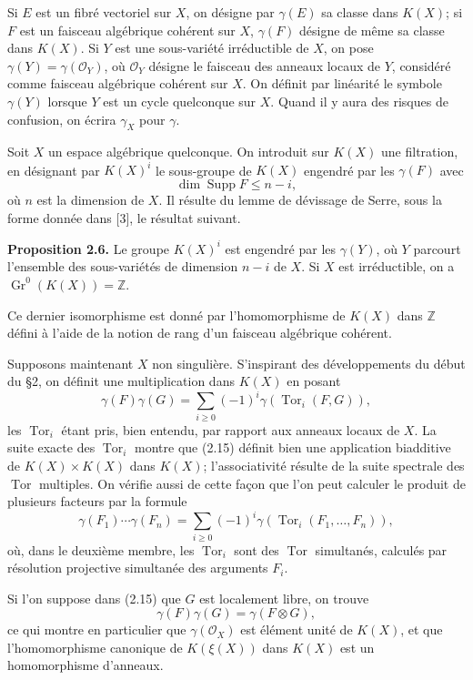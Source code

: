 \documentclass[11pt]{article}
\newcommand{\Gr}{\operatorname{Gr}}
\newcommand{\Tor}{\operatorname{Tor}}
\providecommand{\Z}{\mathbb Z}
\providecommand{\Gr}{\operatorname{Gr}}
\providecommand{\Tor}{\operatorname{Tor}}
\providecommand{\Supp}{\operatorname{Supp}}
\providecommand{\Gr}{\operatorname{G}}
\providecommand{\cO}{\mathcal O}
\begin{document}
Si $E$ est un fibré vectoriel sur $X$, on désigne par $\gamma(E)$ sa classe dans $K(X)$; si $F$ est un faisceau algébrique cohérent sur $X$, $\gamma(F)$ désigne de même sa classe dans $K(X)$. Si $Y$ est une sous-variété irréductible de $X$, on pose $\gamma(Y)=\gamma(\cO_Y)$, où $\cO_Y$ désigne le faisceau des anneaux locaux de $Y$, considéré comme faisceau algébrique cohérent sur $X$. On définit par linéarité le symbole $\gamma(Y)$ lorsque $Y$ est un cycle quelconque sur $X$. Quand il y aura des risques de confusion, on écrira $\gamma_X$ pour $\gamma$.

Soit $X$ un espace algébrique quelconque. On introduit sur $K(X)$ une filtration, en désignant par $K(X)^i$ le sous-groupe de $K(X)$ engendré par les $\gamma(F)$ avec
\[
 \dim\Supp F\leq n-i,
\]
où $n$ est la dimension de $X$. Il résulte du lemme de dévissage de Serre, sous la forme donnée dans [3], le résultat suivant.

\textbf{Proposition 2.6.} Le groupe $K(X)^i$ est engendré par les $\gamma(Y)$, où $Y$ parcourt l'ensemble des sous-variétés de dimension $n-i$ de $X$. Si $X$ est irréductible, on a $\Gr^0(K(X))=\Z$.

Ce dernier isomorphisme est donné par l'homomorphisme de $K(X)$ dans $\Z$ défini à l'aide de la notion de rang d'un faisceau algébrique cohérent.

Supposons maintenant $X$ non singulière. S'inspirant des développements du début du \S 2, on définit une multiplication dans $K(X)$ en posant
\begin{equation}\tag{2.15}
 \gamma(F)\gamma(G)=\sum_{i\geq0}(-1)^i\gamma(\Tor_i(F,G)),
\end{equation}
les $\Tor_i$ étant pris, bien entendu, par rapport aux anneaux locaux de $X$. La suite exacte des $\Tor_i$ montre que (2.15) définit bien une application biadditive de $K(X)\times K(X)$ dans $K(X)$; l'associativité résulte de la suite spectrale des $\Tor$ multiples. On vérifie aussi de cette façon que l'on peut calculer le produit de plusieurs facteurs par la formule
\begin{equation}\tag{2.16}
 \gamma(F_1)\cdots\gamma(F_n)=\sum_{i\geq0}(-1)^i\gamma(\Tor_i(F_1,\ldots,F_n)),
\end{equation}
où, dans le deuxième membre, les $\Tor_i$ sont des $\Tor$ simultanés, calculés par résolution projective simultanée des arguments $F_i$.

Si l'on suppose dans (2.15) que $G$ est localement libre, on trouve
\begin{equation}\tag{2.15 bis}
 \gamma(F)\gamma(G)=\gamma(F\otimes G),
\end{equation}
ce qui montre en particulier que $\gamma(\cO_X)$ est élément unité de $K(X)$, et que l'homomorphisme canonique de $K(\xi(X))$ dans $K(X)$ est un homomorphisme d'anneaux.
\end{document}
